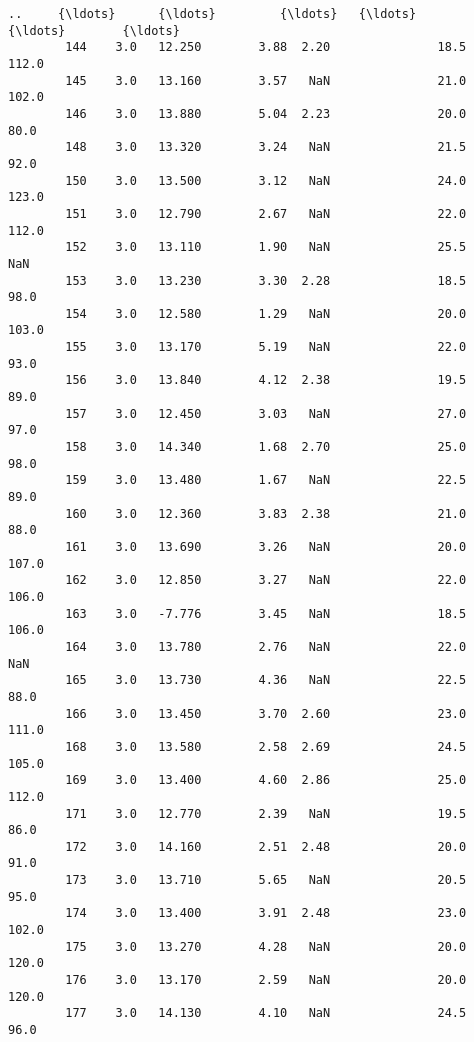 \documentclass[11pt]{article}
\begin{document}
\begin{Verbatim}[commandchars=\\\{\}]
        ..     {\ldots}      {\ldots}         {\ldots}   {\ldots}                {\ldots}        {\ldots}   
        144    3.0   12.250        3.88  2.20               18.5      112.0   
        145    3.0   13.160        3.57   NaN               21.0      102.0   
        146    3.0   13.880        5.04  2.23               20.0       80.0   
        148    3.0   13.320        3.24   NaN               21.5       92.0   
        150    3.0   13.500        3.12   NaN               24.0      123.0   
        151    3.0   12.790        2.67   NaN               22.0      112.0   
        152    3.0   13.110        1.90   NaN               25.5        NaN   
        153    3.0   13.230        3.30  2.28               18.5       98.0   
        154    3.0   12.580        1.29   NaN               20.0      103.0   
        155    3.0   13.170        5.19   NaN               22.0       93.0   
        156    3.0   13.840        4.12  2.38               19.5       89.0   
        157    3.0   12.450        3.03   NaN               27.0       97.0   
        158    3.0   14.340        1.68  2.70               25.0       98.0   
        159    3.0   13.480        1.67   NaN               22.5       89.0   
        160    3.0   12.360        3.83  2.38               21.0       88.0   
        161    3.0   13.690        3.26   NaN               20.0      107.0   
        162    3.0   12.850        3.27   NaN               22.0      106.0   
        163    3.0   -7.776        3.45   NaN               18.5      106.0   
        164    3.0   13.780        2.76   NaN               22.0        NaN   
        165    3.0   13.730        4.36   NaN               22.5       88.0   
        166    3.0   13.450        3.70  2.60               23.0      111.0   
        168    3.0   13.580        2.58  2.69               24.5      105.0   
        169    3.0   13.400        4.60  2.86               25.0      112.0   
        171    3.0   12.770        2.39   NaN               19.5       86.0   
        172    3.0   14.160        2.51  2.48               20.0       91.0   
        173    3.0   13.710        5.65   NaN               20.5       95.0   
        174    3.0   13.400        3.91  2.48               23.0      102.0   
        175    3.0   13.270        4.28   NaN               20.0      120.0   
        176    3.0   13.170        2.59   NaN               20.0      120.0   
        177    3.0   14.130        4.10   NaN               24.5       96.0   
        

\end{Verbatim}
\end{document}
